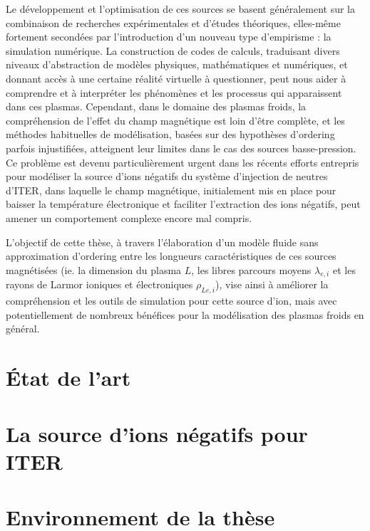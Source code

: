 \begin{refsection}
Le développement et l'optimisation de ces sources se basent généralement sur la
combinaison de recherches expérimentales et d'études théoriques, elles-même
fortement secondées par l'introduction d'un nouveau type d'empirisme : la
simulation numérique.
La construction de codes de calculs, traduisant divers niveaux d'abstraction de
modèles physiques, mathématiques et numériques, et donnant accès à une
certaine réalité virtuelle à questionner, peut nous aider à
comprendre et à interpréter les phénomènes et les processus qui apparaissent dans ces
plasmas. Cependant, dans le domaine des plasmas froids, la compréhension de
l'effet du champ magnétique est loin d'être complète, et les méthodes
habituelles de modélisation, basées sur des hypothèses d'ordering parfois
injustifiées, atteignent leur limites dans le cas des sources basse-pression. Ce
problème est devenu particulièrement urgent dans les récents efforts entrepris pour modéliser
la source d'ions négatifs du système d'injection de neutres d'ITER, dans
laquelle le champ magnétique, initialement mis en place pour baisser la
température électronique et faciliter l'extraction des ions négatifs, peut
amener un comportement complexe encore mal compris. 

L'objectif de cette thèse, à travers l'élaboration d'un modèle fluide sans
approximation d'ordering entre les longueurs caractéristiques de ces sources
magnétisées (ie. la dimension du plasma $L$, les libres parcours moyens
$\lambda_{e,i}$ et les rayons de Larmor ioniques et électroniques
$\rho_{Le,i}$),
vise ainsi à améliorer la compréhension et les outils de simulation pour
cette source d'ion, mais avec potentiellement de nombreux bénéfices pour la
modélisation des plasmas froids en général.

\section{État de l'art}


\section{La source d'ions négatifs pour ITER}


\section{Environnement de la thèse}

				
		

\end{refsection}
